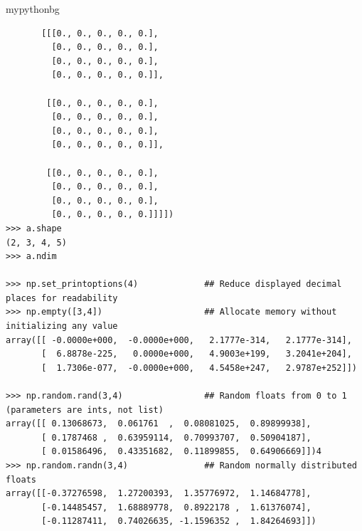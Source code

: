 \begin{tsession}{mypythonbg}
\begin{verbatim}
       [[[0., 0., 0., 0., 0.],
         [0., 0., 0., 0., 0.],
         [0., 0., 0., 0., 0.],
         [0., 0., 0., 0., 0.]],

        [[0., 0., 0., 0., 0.],
         [0., 0., 0., 0., 0.],
         [0., 0., 0., 0., 0.],
         [0., 0., 0., 0., 0.]],

        [[0., 0., 0., 0., 0.],
         [0., 0., 0., 0., 0.],
         [0., 0., 0., 0., 0.],
         [0., 0., 0., 0., 0.]]]])
>>> a.shape
(2, 3, 4, 5)
>>> a.ndim

>>> np.set_printoptions(4)             ## Reduce displayed decimal places for readability
>>> np.empty([3,4])                    ## Allocate memory without initializing any value
array([[ -0.0000e+000,  -0.0000e+000,   2.1777e-314,   2.1777e-314],
       [  6.8878e-225,   0.0000e+000,   4.9003e+199,   3.2041e+204],
       [  1.7306e-077,  -0.0000e+000,   4.5458e+247,   2.9787e+252]])

>>> np.random.rand(3,4)                ## Random floats from 0 to 1 (parameters are ints, not list)
array([[ 0.13068673,  0.061761  ,  0.08081025,  0.89899938],
       [ 0.1787468 ,  0.63959114,  0.70993707,  0.50904187],
       [ 0.01586496,  0.43351682,  0.11899855,  0.64906669]])4
>>> np.random.randn(3,4)               ## Random normally distributed floats
array([[-0.37276598,  1.27200393,  1.35776972,  1.14684778],
       [-0.14485457,  1.68889778,  0.8922178 ,  1.61376074],
       [-0.11287411,  0.74026635, -1.1596352 ,  1.84264693]])
\end{verbatim}
\end{tsession}
